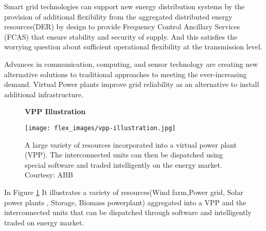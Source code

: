 \documentclass[nonacm,sigconf,12pt]{acmart}
\begin{document}
Smart grid technologies can support new energy distribution systems by the provision of additional flexibility from the aggregated distributed energy resources(DER) by design to provide Frequency Control Ancillary Services (FCAS) that ensure stability and security of supply\cite{riesz_2015_frequency}. And this satisfies the worrying question about sufficient operational flexibility at the transmission level\cite{mayorgagonzalez_2018_determination}.

Advances in communication, computing, and sensor technology are creating new alternative solutions to traditional approaches to meeting the ever-increasing demand. Virtual Power plants improve grid reliability as an alternative to install additional infrastructure.

\begin{figure}
 \textbf{VPP Illustration}\par\medskip
 \texttt{[image: flex\_images/vpp-illustration.jpg]}
 \caption{A large variety of resources incorporated into a virtual power plant (VPP). The interconnected units can then be dispatched using special software and traded intelligently on the energy market. Courtesy: ABB \cite{power_2020_the}}
 \label{fig:vppIllustration}
\end{figure}
In Figure \ref{fig:vppIllustration} It illustrates a variety of resources(Wind farm,Power grid, Solar power plants , Storage, Biomass powerplant) aggregated into a VPP and the interconnected units that can be dispatched through software and intelligently traded on energy market.\cite{power_2020_the}
\end{document}
